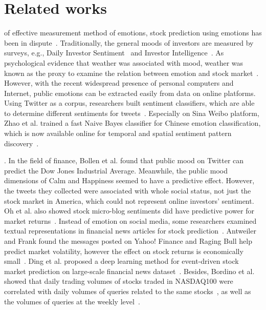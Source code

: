 \documentclass[aps,preprint,groupedaddress]{revtex4-1}
\begin{document}
\section{Related works}
\label{sec:related_works}

{} of effective measurement method of emotions, stock prediction using emotions has been in dispute~\cite{NBERw13189,brown2004investor}. Traditionally, the general moods of investors are measured by surveys, e.g., Daily Investor Sentiment~\cite{Antweiler2004Is} and Investor Intelligence~\cite{asur2010predicting}. As psychological evidence {\color{black}{demonstrated}} that weather was associated with mood, weather was known as the proxy to examine the relation between emotion and stock market~\cite{Hirshleifer2003Good,Howarth1984A}. However, with the recent widespread presence of personal computers and Internet, public emotions can be extracted easily from data on online platforms. Using Twitter as a corpus, researchers built sentiment classifiers, which are able to determine different sentiments for tweets~\cite{baseline_method,pak2010twitter,twitter_various_techniques}. Especially on Sina Weibo platform, Zhao et al. trained a fast Naive Bayes classifier for Chinese emotion classification, which is now available online for temporal and spatial sentiment pattern discovery~\cite{moodlens}. {\color{black}{These works indeed provide foundations for considering public emotions as input for stock predictions.}}

{}. In the field of finance, Bollen et al. found that public mood on Twitter can predict the Dow Jones Industrial Average\cite{Bollen_predict_market}. Meanwhile, the public mood dimensions of Calm and Happiness seemed to have a predictive effect. However, the tweets they collected were associated with whole social status, not just the stock market in America, which could not {\color{black}{well}} represent online investors' sentiment. Oh et al. also showed stock micro-blog sentiments did have predictive power for market returns~\cite{oh2011investigating}. Instead of emotion on social media, some researchers examined textual representations in financial news articles for stock prediction~\cite{Schumaker2009bu,cohen2013mood}. Antweiler and Frank found the messages posted on Yahoo! Finance and Raging Bull help predict market volatility, however the effect on stock returns is economically small~\cite{Antweiler2004Is}. Ding et al. proposed a deep learning method for event-driven stock market prediction on large-scale financial news dataset~\cite{XiaoDing:2015uo,leinweber2011event}. Besides, Bordino et al. showed that daily trading volumes of stocks traded in NASDAQ100 were correlated with daily volumes of queries related to the same stocks~\cite{bordino2012web}, as well as the volumes of queries at the weekly level~\cite{preis2010complex}.
\end{document}
